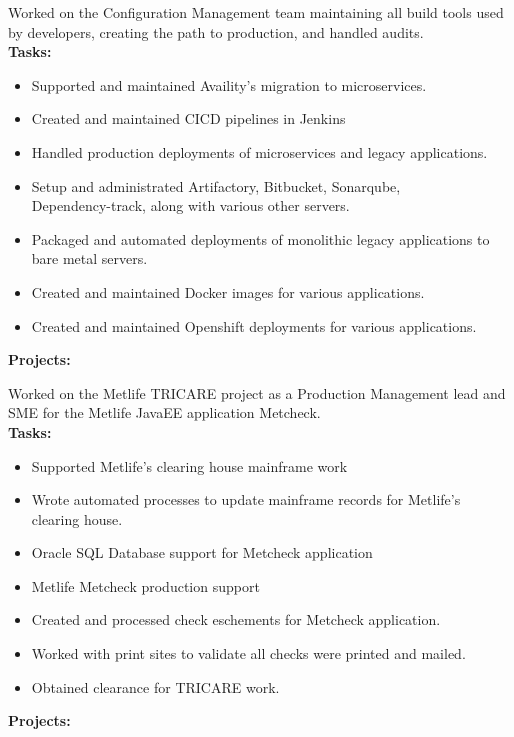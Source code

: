 \documentclass[10pt,a4paper,ragged2e,withhyper]{altacv}
\begin{document}
\begin{paracol}{2}

Worked on the Configuration Management team maintaining all build tools used by developers, creating the path to production, and handled audits.  \\

\smallskip
\textbf{Tasks:}
\begin{itemize}
\item Supported and maintained Availity's migration to microservices.
\item Created and maintained CICD pipelines in Jenkins
\item Handled production deployments of microservices and legacy applications.
\item Setup and administrated Artifactory, Bitbucket, Sonarqube, \\Dependency-track, along with various other servers. 
\item Packaged and automated deployments of monolithic legacy applications to bare metal servers.
\item Created and maintained Docker images for various applications.
\item Created and maintained Openshift deployments for various applications.
\end{itemize}
\smallskip
\textbf{Projects:}

\divider

  Worked on the Metlife TRICARE project as a Production Management lead and SME for the Metlife JavaEE application Metcheck. \\

\textbf{Tasks:}
\begin{itemize}
\item Supported Metlife's clearing house mainframe work
\item Wrote automated processes to update mainframe records for Metlife's clearing house. 
\item Oracle SQL Database support for Metcheck application
\item Metlife Metcheck production support
\item Created and processed check eschements for Metcheck application.
\item Worked with print sites to validate all checks were printed and mailed. 
\item Obtained clearance for TRICARE work.
\end{itemize}
\smallskip
\textbf{Projects:}


\end{paracol}
\end{document}
